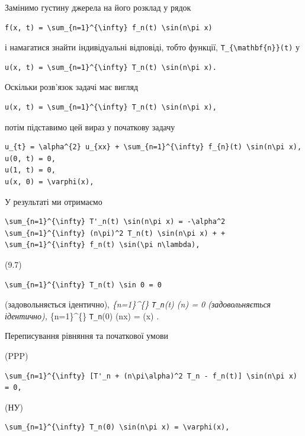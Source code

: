 \documentclass[
  ukrainian,
]{article}
\begin{document}
Замінимо густину джерела на його розклад у рядок

\begin{verbatim}
f(x, t) = \sum_{n=1}^{\infty} f_n(t) \sin(n\pi x)
\end{verbatim}

і намагатися знайти індивідуальні відповіді, тобто функції,
\texttt{T\_\{\textbackslash{}mathbf\{n\}\}(t)} у

\begin{verbatim}
u(x, t) = \sum_{n=1}^{\infty} T_n(t) \sin(n\pi x).
\end{verbatim}

Оскільки розв'язок задачі має вигляд

\begin{verbatim}
u(x, t) = \sum_{n=1}^{\infty} T_n(t) \sin(n\pi x),
\end{verbatim}

потім підставимо цей вираз у початкову задачу

\begin{verbatim}
u_{t} = \alpha^{2} u_{xx} + \sum_{n=1}^{\infty} f_{n}(t) \sin(n\pi x),
u(0, t) = 0,
u(1, t) = 0,
u(x, 0) = \varphi(x),
\end{verbatim}

У результаті ми отримаємо

\begin{verbatim}
\sum_{n=1}^{\infty} T'_n(t) \sin(n\pi x) = -\alpha^2 \sum_{n=1}^{\infty} (n\pi)^2 T_n(t) \sin(n\pi x) + + \sum_{n=1}^{\infty} f_n(t) \sin(\pi n\lambda),
\end{verbatim}

(9.7)

\begin{verbatim}
\sum_{n=1}^{\infty} T_n(t) \sin 0 = 0
\end{verbatim}

(задовольняється ідентично), \sum\emph{\{n=1\}\^{}\{\infty\}
\texttt{T\_n}(t) \sin (n\pi) = 0 (задовольняється ідентично),
\sum}\{n=1\}\^{}\{\infty\} \texttt{T\_n}(0) \sin (n\pi x) = \phi(x) .

Переписування рівняння та початкової умови

(PPP)

\begin{verbatim}
\sum_{n=1}^{\infty} [T'_n + (n\pi\alpha)^2 T_n - f_n(t)] \sin(n\pi x) = 0,
\end{verbatim}

(НУ)

\begin{verbatim}
\sum_{n=1}^{\infty} T_n(0) \sin(n\pi x) = \varphi(x),
\end{verbatim}
\end{document}
